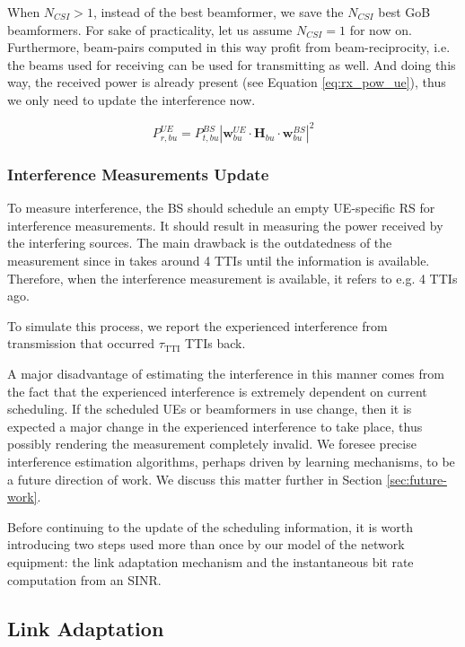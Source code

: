 When $N_{CSI} > 1$, instead of the best beamformer, we save the $N_{CSI}$ best GoB beamformers. For sake of practicality, let us assume $N_{CSI} = 1$ for now on. Furthermore, beam-pairs computed in this way profit from beam-reciprocity, i.e. the beams used for receiving can be used for transmitting as well. And doing this way, the received power is already present (see Equation \eqref{eq:rx_pow_ue}), thus we only need to update the interference now.

\begin{equation} \label{eq:rx_pow_ue}
    P_{r, bu}^{UE} = P_{t, bu}^{BS} \left| \bm{w}^{UE}_{bu} \cdot \bm{H}_{bu} \cdot \bm{w}^{BS}_{bu} \right|^2 
\end{equation}


\subsubsection*{Interference Measurements Update}

To measure interference, the \ac{BS} should schedule an empty UE-specific \acs{RS} for interference measurements. It should result in measuring the power received by the interfering sources. The main drawback is the outdatedness of the measurement since in takes around 4 TTIs until the information is available. Therefore, when the interference measurement is available, it refers to e.g. 4 TTIs ago. 

To simulate this process, we report the experienced interference from transmission that occurred $\tau_\text{TTI}$ TTIs back. 

A major disadvantage of estimating the interference in this manner comes from the fact that the experienced interference is extremely dependent on current scheduling. If the scheduled UEs or beamformers in use change, then it is expected a major change in the experienced interference to take place, thus possibly rendering the measurement completely invalid. We foresee precise interference estimation algorithms, perhaps driven by learning mechanisms, to be a future direction of work. We discuss this matter further in Section \ref{sec:future-work}. 

Before continuing to the update of the scheduling information, it is worth introducing two steps used more than once by our model of the network equipment: the link adaptation mechanism and the instantaneous bit rate computation from an SINR.

\subsection{Link Adaptation}
\label{sec:olla}


